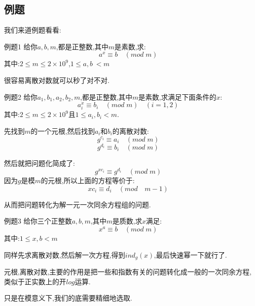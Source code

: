 \documentclass[9pt]{beamer}
\begin{document}
		\subsection{例题}
		\begin{frame}
			我们来道例题看看:
			\begin{block}{例题1}
				给你$a,b,m$,都是正整数,其中$m$是素数,求:
				$$
					a^x \equiv b \quad (mod \; m)
				$$
				其中:$2 \leq m \leq 2\times10^9$,$1 \leq a, b\ < m$
			\end{block}
			
						\pause
			
			很容易离散对数就可以秒了对不对.
		\end{frame}
		\begin{frame}
			\begin{block}{例题2}
				给你$a_1,b_1,a_2,b_2,m$,都是正整数,其中$m$是素数,求满足下面条件的$x$:
				$$
					a_i^x \equiv b_i \quad (mod\; m) \quad(i = 1, 2)
				$$
				其中:$2 \leq m \leq 2\times10^9$且$1 \leq a_i, b_i < m$.
			\end{block}

		\end{frame}
		\begin{frame}
				先找到$m$的一个元根,然后找到$a_i$和$b_i$的离散对数:
				$$
				g^{c_i} \equiv a_i \quad (mod \; m)
				$$
				$$
				g^{d_i} \equiv b_i \quad( mod \; m)
				$$
				
							\pause
				
				然后就把问题化简成了:
				$$
				g^{xc_i} \equiv g^{d_i} \quad( mod \; m)
				$$
				因为$g$是模$m$的元根,所以上面的方程等价于:
				$$
					xc_i \equiv d_i \quad(mod \quad m - 1)
				$$
				
							\pause
				
				从而把问题转化为解一元一次同余方程组的问题.
			\end{frame}
						
			\begin{frame}
				\begin{block}{例题3}
				给你三个正整数$a,b,m$,其中$m$是质数,求$x$满足:
				$$
						x^a \equiv b \quad (mod\;  m)
				$$
				其中:$1 \leq x, b< m$
				\end{block}
				
							\pause
				
				同样先求离散对数,然后解一次方程,得到$ind_g(x)$,最后快速幂一下就行了.
			\end{frame}
			\begin{frame}
				元根,离散对数,主要的作用是把一些和指数有关的问题转化成一般的一次同余方程,类似于正实数上的开$log$运算.
				
				只是在模意义下,我们的底需要精细地选取.
			\end{frame}
	
\end{document}
